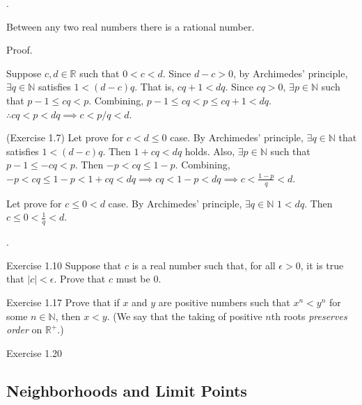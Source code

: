 \documentclass[8pt]{beamer}
\newcommand{\mbb}[1]{\mathbb{#1}}
\newcommand{\ti}[1]{\textit{#1}}
\newcommand{\abs}[1]{\left\lvert #1 \right\rvert}
\begin{document}
\begin{frame}{.}
    \begin{theorem} \label{th:3}
        Between any two real numbers there is a rational number.

        Proof.

        Suppose $c, d \in \mbb{R}$ such that $0 < c< d$.
        Since $d -c >0$, by Archimedes' principle, $\exists q \in \mbb{N}$ satisfies $1 < (d-c) q$.
        That is, $cq +1 < dq$.
        Since $cq > 0$, $\exists p \in \mbb{N}$ such that $p- 1\leq cq < p$.
        Combining, $p-1 \leq cq < p  \leq cq + 1 < dq$.
        $\therefore cq < p <dq \implies c < p/q < d$.

        (Exercise 1.7) Let prove for $c < d \leq 0$ case.
        By Archimedes' principle, $\exists q \in \mbb{N}$ that satisfies $1 < (d-c) q$.
        Then $1 + cq < dq$ holds.
        Also, $\exists p \in \mbb{N}$ such that $p-1 \leq - cq < p$.
        Then $-p < cq \leq 1-p$.
        Combining, $-p < cq \leq 1 -p < 1+cq < dq \implies cq < 1-p <dq \implies c < \frac{1-p}{q} < d$.

        Let prove for $c \leq 0 < d$ case.
        By Archimedes' principle, $\exists q \in \mbb{N}$ $1 < dq$.
        Then $c \leq 0 < \frac{1}{q} < d$.
    \end{theorem}
\end{frame}

\begin{frame}{.}
    \begin{block}{Exercise 1.10} \label{exercise:1.10}
        Suppose that $c$ is a real number such that, for all $\epsilon >0$, it is true that $\abs{c} < \epsilon$.
        Prove that $c$ must be $0$.
    \end{block}

    \begin{block}{Exercise 1.17}
        Prove that if $x$ and $y$ are positive numbers such that $x^n < y^n$ for some $n \in \mbb{N}$, then $x < y$.
        (We say that the taking of positive $n$th roots \ti{preserves order} on $\mbb{R}^+$.)
    \end{block}

    \begin{block}{Exercise 1.20}
    \end{block}
\end{frame}

\subsection{Neighborhoods and Limit Points}
\end{document}
